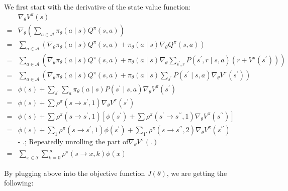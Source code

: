 \begin{appendices}
	We first start with the derivative of the state value function:
	\begin{equation}
	\begin{aligned}
	 &\nabla_{\theta} V^{\pi}(s) \\
	=&\nabla_{\theta}(\sum_{a \in \mathcal{A}} \pi_{\theta}(a \mid s) Q^{\pi}(s,a)) \\
	=&\sum_{a \in \mathcal{A}}\left(\nabla_{\theta} \pi_{\theta}(a \mid s) Q^{\pi}(s, a)+\pi_{\theta}(a \mid s) \nabla_{\theta} Q^{\pi}(s, a)\right) \\
	=&\sum_{a \in \mathcal{A}}(\nabla_{\theta} \pi_{\theta}(a \mid s) Q^{\pi}(s, a)+\pi_{\theta}(a \mid s) \nabla_{\theta} \sum_{s^{\prime}, r} P\left(s^{\prime}, r \mid s, a\right)\left(r+V^{\pi}\left(s^{\prime}\right)\right)) \\
	=& \sum_{a \in \mathcal{A}}(\nabla_{\theta} \pi_{\theta}(a \mid s) Q^{\pi}(s, a)+\pi_{\theta}(a \mid s) \sum_{s^{\prime}} P\left(s^{\prime} \mid s, a\right) \nabla_{\theta} V^{\pi}\left(s^{\prime}\right)) \\
	=& \phi(s)+\sum_{s^{\prime}} \sum_{a} \pi_{\theta}(a \mid s) P\left(s^{\prime} \mid s, a\right) \nabla_{\theta} V^{\pi}\left(s^{\prime}\right) \\
	=& \phi(s)+\sum \rho^{\pi}\left(s \rightarrow s^{\prime}, 1\right) \nabla_{\theta} V^{\pi}\left(s^{\prime}\right) \\
	=& \phi(s)+\sum \rho^{\pi}\left(s \rightarrow s^{\prime}, 1\right)\left[\phi\left(s^{\prime}\right)+\sum \rho^{\pi}\left(s^{\prime} \rightarrow s^{\prime \prime}, 1\right) \nabla_{\theta} V^{\pi}\left(s^{\prime \prime}\right)\right] \\
	=& \phi(s)+\sum_{1} \rho^{\pi}\left(s \rightarrow s^{\prime}, 1\right) \phi\left(s^{\prime}\right)+\sum_{1 \prime} \rho^{\pi}\left(s \rightarrow s^{\prime \prime}, 2\right) \nabla_{\theta} V^{\pi}\left(s^{\prime \prime}\right) \\
	=& \text{- .; Repeatedly unrolling the part of} \nabla_{\theta} V^{\pi}(.) \\
	=& \sum_{x \in \mathcal{S}} \sum_{k=0}^{\infty} \rho^{\pi}(s \rightarrow x, k) \phi(x)
	\end{aligned}
	\end{equation}
	
	By plugging above into the objective function $J(\theta)$, we are getting the following:
	

\end{appendices}

